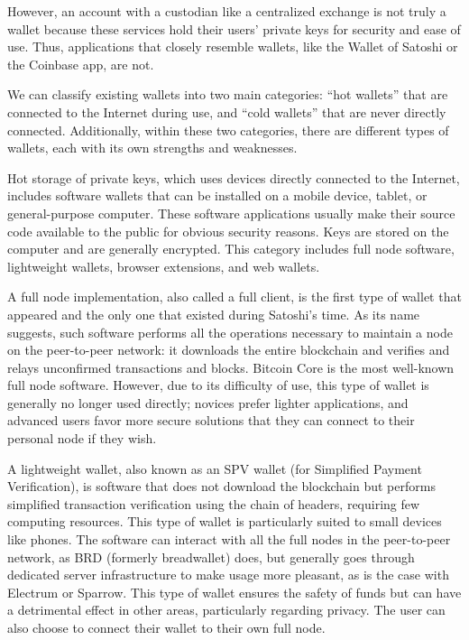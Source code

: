 \documentclass[
  a5paper,
  smalldemyvopaper,10pt,twoside,onecolumn,openright,extrafontsizes,hidelinks]{memoir}
\begin{document}
However, an account with a custodian like a centralized exchange is not
truly a wallet because these services hold their users' private keys for
security and ease of use. Thus, applications that closely resemble
wallets, like the Wallet of Satoshi or the Coinbase app, are not.

We can classify existing wallets into two main categories: ``hot
wallets'' that are connected to the Internet during use, and ``cold
wallets'' that are never directly connected. Additionally, within these
two categories, there are different types of wallets, each with its own
strengths and weaknesses.

Hot storage of private keys, which uses devices directly connected to
the Internet, includes software wallets that can be installed on a
mobile device, tablet, or general-purpose computer. These software
applications usually make their source code available to the public for
obvious security reasons. Keys are stored on the computer and are
generally encrypted. This category includes full node software,
lightweight wallets, browser extensions, and web wallets.

A full node implementation, also called a full client, is the first type
of wallet that appeared and the only one that existed during Satoshi's
time. As its name suggests, such software performs all the operations
necessary to maintain a node on the peer-to-peer network: it downloads
the entire blockchain and verifies and relays unconfirmed transactions
and blocks. Bitcoin Core is the most well-known full node software.
However, due to its difficulty of use, this type of wallet is generally
no longer used directly; novices prefer lighter applications, and
advanced users favor more secure solutions that they can connect to
their personal node if they wish.

A lightweight wallet, also known as an SPV wallet (for Simplified
Payment Verification), is software that does not download the blockchain
but performs simplified transaction verification using the chain of
headers, requiring few computing resources. This type of wallet is
particularly suited to small devices like phones. The software can
interact with all the full nodes in the peer-to-peer network, as BRD
(formerly breadwallet) does, but generally goes through dedicated server
infrastructure to make usage more pleasant, as is the case with Electrum
or Sparrow. This type of wallet ensures the safety of funds but can have
a detrimental effect in other areas, particularly regarding privacy. The
user can also choose to connect their wallet to their own full node.
\end{document}
